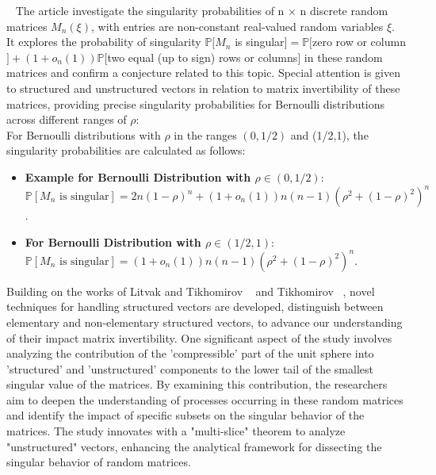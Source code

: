 ~\cite{jain2021singularity}
The article investigate the singularity probabilities of n $\times$ n discrete random matrices ${M_n}(\xi)$, with entries are non-constant real-valued random variables $\xi$. 
It explores the probability of singularity $ \mathbb{P}[M_n$ is singular$]=\mathbb{P}[$zero row or column$]+ (1+o_n(1))\mathbb{P}[$two equal (up to sign) rows or columns$]$ in these random matrices and confirm a conjecture related to this topic. 
Special attention is given to structured and unstructured vectors in relation to matrix invertibility of these matrices, providing precise singularity probabilities for Bernoulli distributions across different ranges of $\rho$:\\
For Bernoulli distributions with $\rho$ in the ranges $(0,1/2)$ and (1/2,1), the singularity probabilities are calculated as follows:
\begin{itemize}
    \item \textbf{Example for Bernoulli Distribution with $\rho \in (0, 1/2)$}: \\
    $\mathbb{P}[M_n \text{ is singular}] = 2n(1-\rho)^n + (1+o_n(1))n(n-1)(\rho^2+(1-\rho)^2)^n$.
    \item \textbf{For Bernoulli Distribution with $\rho \in (1/2, 1)$}: \\
    $\mathbb{P}[M_n \text{ is singular}] = (1+o_n(1))n(n-1)(\rho^2+(1-\rho)^2)^n$.
\end{itemize}
Building on the works of Litvak and Tikhomirov ~\cite{litvak2022singularity} and Tikhomirov ~\cite{tikhomirov2020singularity}, novel techniques for handling structured vectors are developed, distinguish between elementary and non-elementary structured vectors, to advance our understanding of their impact matrix invertibility.
One significant aspect of the study involves analyzing the contribution of the 'compressible' part of the unit sphere into 'structured' and 'unstructured' components to the lower tail of the smallest singular value of the matrices. By examining this contribution, the researchers aim to deepen the understanding of processes occurring in these random matrices and identify the impact of specific subsets on the singular behavior of the matrices.
The study innovates with a "multi-slice" theorem to analyze "unstructured" vectors, enhancing the analytical framework for dissecting the singular behavior of random matrices.
